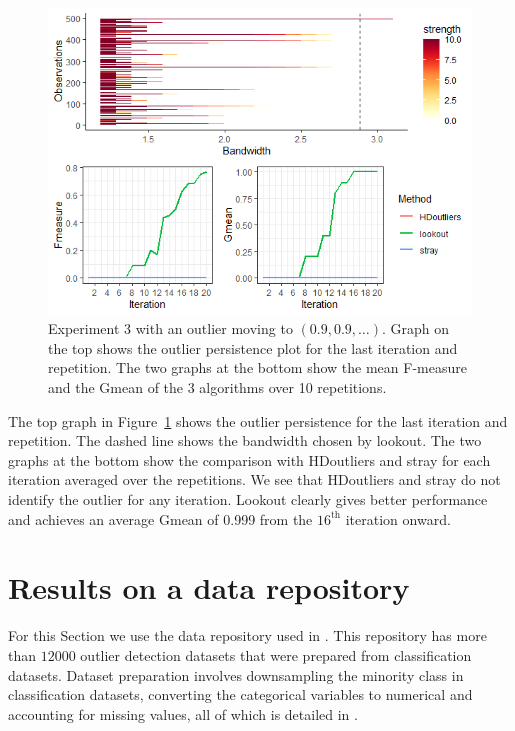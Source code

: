 \documentclass[letter,12pt]{article}
\begin{document}
\begin{figure}[!ht]
    \centering
    \includegraphics[scale=0.8]{Graphics/Comparison_Ex3.png}
    \caption{Experiment 3 with an outlier moving to $(0.9, 0.9, \ldots)$. Graph on the top shows the outlier persistence plot for the last iteration and repetition. The  two graphs at the bottom show the mean F-measure and the Gmean of the 3 algorithms over 10 repetitions. }
    \label{fig:ComparisonEx3}
\end{figure}

The top graph in Figure~\ref{fig:ComparisonEx3} shows the outlier persistence for the last iteration and repetition. The dashed line shows the bandwidth chosen by lookout. The two graphs at the bottom show the comparison with HDoutliers and stray for each iteration averaged over the repetitions. We see that HDoutliers and stray do not identify the outlier for any iteration. Lookout clearly gives better performance and achieves an average Gmean of 0.999  from the $16^{\text{th}}$ iteration onward. 
\section{Results on  a data repository}\label{sec:applications}
For this Section we use the data repository used in \cite{datasets}. This repository has more than $12000$ outlier detection datasets that were prepared from classification datasets. Dataset preparation involves downsampling the minority class in classification datasets, converting the categorical variables to  numerical and accounting for missing values, all of which is detailed in \cite{normalizationoutliers} . 
\end{document}
